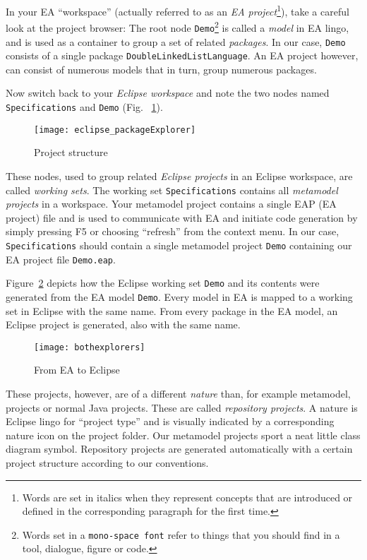 In your EA ``workspace'' (actually referred to as an \emph{EA project}\footnote{Words are set in italics when they represent concepts that are introduced or defined  in the corresponding paragraph for the first time.}), take a careful  look at the project browser:  The root node \texttt{Demo}\footnote{Words set  in a \texttt{mono-space font} refer to things that you should find in a tool,  dialogue, figure or code.} is called a \emph{model} in EA lingo, and is used as a  container to group a set of related \emph{packages}. 
In our case, \texttt{Demo}  consists of a single package \texttt{DoubleLinkedListLanguage}.
An EA project however, can consist of numerous models that in turn, group numerous packages.

Now switch back to your \emph{Eclipse workspace} and note the two nodes named \texttt{Spe\-ci\-fi\-ca\-tions} and \texttt{Demo} (Fig. ~\ref{fig_eclipsePS}).  

\begin{figure}[htbp]
    \centering
    \texttt{[image: eclipse\_packageExplorer]}
    \caption{Project structure}
    \label{fig_eclipsePS}
 \end{figure}

These nodes, used to group related \emph{Eclipse projects} in an Eclipse workspace, are called \emph{working sets}. The working set \texttt{Spe\-ci\-fi\-ca\-tions} contains all \emph{metamodel projects} in a  workspace. Your metamodel project contains a single EAP (EA project) file and is used to communicate with EA and initiate code generation by simply pressing F5 or choosing ``refresh'' from the context menu.
In our case, \texttt{Specifications} should contain a single metamodel project \texttt{Demo} containing our EA project file  \texttt{Demo.eap}.
 
Figure~\ref{fig_fromEAtoEclipse} depicts how the Eclipse working set \texttt{Demo} and its contents were generated from the EA model \texttt{Demo}. Every model in EA is mapped to a working set in Eclipse with the same name. From every package in the EA model, an Eclipse project is generated, also with the same name. 

\begin{figure}[htbp]
    \centering
  \texttt{[image: bothexplorers]}
    \caption{From EA to Eclipse}
    \label{fig_fromEAtoEclipse}
\end{figure}

These projects, however, are of a different \emph{nature} than, for example metamodel, projects or normal Java projects. These are called \emph{repository projects}.  
A nature is Eclipse lingo for ``project type'' and is visually indicated by a corresponding nature icon on the project folder.
Our metamodel projects sport a neat little class diagram symbol. 
Repository projects are generated automatically with a certain project structure according to our conventions.  

